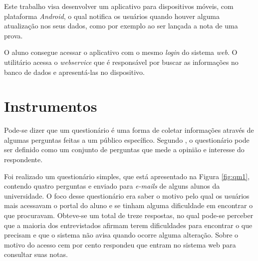 	\par Este trabalho visa desenvolver um aplicativo para dispositivos móveis, 
com plataforma \textit{Android}, o qual notifica os usuários quando houver alguma
atualização nos seus dados, como por exemplo ao ser lançada a nota de uma prova.
	
	\par O aluno consegue acessar o aplicativo com o mesmo \textit{login} do
sistema \textit{web}. O utilitário acessa o \textit{webservice} que é
responsável por buscar as informações no banco de dados e apresentá-las no
dispositivo.
	
\section{Instrumentos}

	\par Pode-se dizer que um questionário é uma forma de coletar informações
através de algumas perguntas feitas a um público específico. Segundo
, o questionário pode ser definido como um conjunto
de perguntas que mede a opinião e interesse do respondente.

	\par Foi realizado um questionário simples, que está apresentado na Figura
\ref{fig:qm1}, contendo quatro perguntas e enviado para \textit{e-mails} de
alguns alunos da universidade. O foco desse questionário era saber o motivo pelo qual
os usuários mais acessavam o portal do aluno e se tinham alguma dificuldade em
encontrar o que procuravam. Obteve-se um total de treze respostas, no qual
pode-se perceber que a maioria dos entrevistados afirmam terem dificuldades
para encontrar o que precisam e que o sistema não avisa quando ocorre alguma
alteração. Sobre o motivo do acesso cem por cento respondeu que entram no
sistema web para consultar suas notas.

